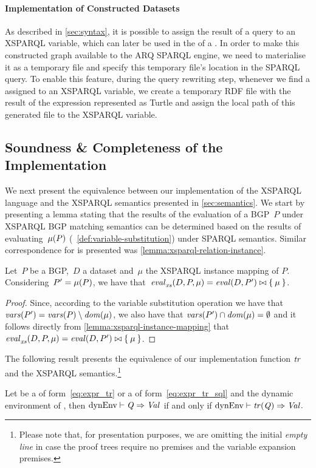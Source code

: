 \paragraph*{Implementation of Constructed Datasets}
\label{sec:constructed-dataset}
%
As described in \cref{sec:syntax}, it is possible to assign the result of a \CONSTRUCT query to an XSPARQL
variable, which can later be used in the \DatasetClause of a \SparqlForClause.
%
In order to make this constructed graph available to the ARQ SPARQL engine, we need to materialise it as a temporary
file and specify this temporary file's location in the SPARQL query.
%
To enable this feature, during the query rewriting step, whenever we find a \ConstructClause assigned to an XSPARQL
variable, we create a temporary \ac{RDF} file with the result of the \CONSTRUCT expression represented as Turtle and
assign the local path of this generated file to the XSPARQL variable.


\subsection{Soundness \& Completeness of the Implementation}
\label{sec:soundn-compl}
%
We next present the equivalence between our implementation of the XSPARQL language and the XSPARQL semantics presented
in \cref{sec:semantics}.  
%
We start by presenting a lemma stating that the results of the evaluation of a \ac{BGP}~$P$ under XSPARQL \ac{BGP}
matching semantics can be determined based on the results of evaluating~$\mathit{\mu}\!\left(P\right)$
(\cf~\cref{def:variable-substitution}) under SPARQL semantics.  Similar correspondence for  is
presented was \cref{lemma:xsparql-relation-instance}.
%
\begin{lemma}
  \label{lem:replacement-equivalence}
  Let~$P$ be a BGP,~$D$ a dataset and~$\mu$ the XSPARQL instance mapping of $P$.  Considering~$P' = \mathit{\mu}\!\left(P\right)$,
  we have that~$\mathit{{\mathit{eval}}_{\mathit{xs}}^{\mathit{}}}\!\left(D, P, \mu\right) = \mathit{eval}\!\left(D, P'\right) \bowtie \left\{\:\mu\:\right\}$.
\end{lemma}
%
\begin{proof}
  Since, according to the variable substitution operation we have that $\mathit{vars}\!\left(P'\right) = \mathit{vars}\!\left(P\right) \setminus \mathit{dom}\!\left(\mu\right)$, we
  also have that $\mathit{vars}\!\left(P'\right) \cap \mathit{dom}\!\left(\mu\right) = \emptyset$ and it follows directly from
  \cref{lemma:xsparql-instance-mapping} that $\mathit{{\mathit{eval}}_{\mathit{xs}}^{\mathit{}}}\!\left(D, P, \mu\right) = \mathit{eval}\!\left(D, P'\right) \bowtie \left\{\:\mu\:\right\}$.
\end{proof}

The following result presents the equivalence of our implementation function $\mathit{tr}$ and the XSPARQL
semantics.\footnote{Please note that, for presentation purposes, we are omitting the initial \emph{empty line} in case
  the proof trees require no premises and the variable expansion premises.}
%
\begin{proposition}
  \label{prop:sparqlCall}
  Let  be a \SparqlForClause of form~\eqref{eq:expr_tr} or a \SQLForClause of form~\eqref{eq:expr_tr_sql}
  and \dyn the dynamic environment of , then ${\textrm{dynEnv}} \vdash \mathit{{Q}_{}} \Rightarrow \mathit{{Val}_{}}$ if and
  only if ${\textrm{dynEnv}} \vdash \mathit{tr}\!\left(\mathit{{Q}_{}}\right) \Rightarrow \mathit{{Val}_{}}.$
\end{proposition}

